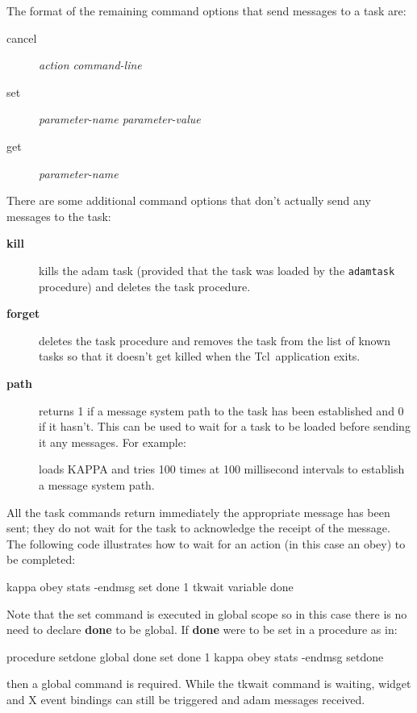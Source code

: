 \documentclass[twoside,11pt,nolof]{starlink}
\providecommand{\Tcl}{{\textsf{Tcl}}}
\begin{document}
The format of the remaining command options that send messages to a task are:
\begin{description}
\item[cancel] \emph{action command-line}
\item[set] \emph{parameter-name parameter-value}
\item[get] \emph{parameter-name}
\end{description}

There are some additional command options that don't actually send any messages
to the task:

\begin{description}
\item [\textbf{kill}] kills the adam task (provided that the task was loaded
by the \texttt{adamtask} procedure) and deletes the task procedure.
\item [\textbf{forget}] deletes the task procedure and removes the task from
the list of known tasks so that it doesn't get killed when the \Tcl\ application
exits.
\item [\textbf{path}]  returns 1
if a message system path to the task has been established and 0 if it hasn't.
This can be used to wait for a task to be loaded before sending it any
messages. For example:


loads KAPPA and tries 100 times at 100 millisecond intervals to establish
a message system path.
\end{description}

All the task commands return immediately the appropriate message has been
sent; they do not wait for the task to acknowledge the receipt of the
message. The following code illustrates how to wait for an action (in
this case an obey) to be completed:
\begin{terminalv}
kappa obey stats -endmsg {set done 1}
tkwait variable done
\end{terminalv}
Note that the set command is executed in global scope so in this case there
is no need to declare \textbf{done} to be global. If \textbf{done} were to be
set in a procedure as in:
\begin{terminalv}
procedure setdone {} {
     global done
     set done 1
}
kappa obey stats -endmsg setdone
\end{terminalv}
then a global command is required. While the tkwait command is waiting,
widget and X event bindings can still be triggered and adam messages
received.
\end{document}
